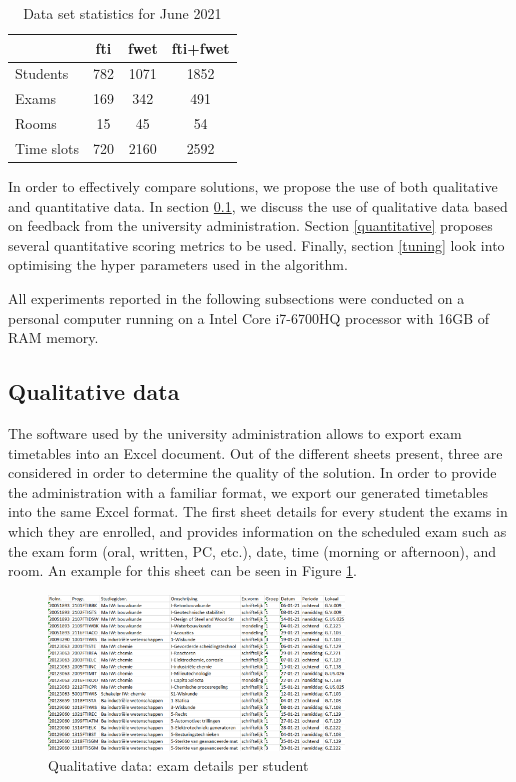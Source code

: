 \begin{table}[h]
	\caption{Data set statistics for June 2021}
	\label{tab:data_set_sem2}
	\centering
	\begin{tabular}{l c c c }
		\hline
		& \textbf{\acrshort{fti}} & \textbf{\acrshort{fwet}} & \textbf{\acrshort{fti}+\acrshort{fwet}} \\ \hline
		Students & 782 & 1071 & 1852 \\
		Exams & 169 & 342 & 491 \\
	    Rooms & 15 & 45 & 54 \\
        Time slots & 720 & 2160 & 2592 \\ \hline
	\end{tabular}
\end{table}

In order to effectively compare solutions, we propose the use of both qualitative and quantitative data. In section \ref{qualitative}, we discuss the use of qualitative data based on feedback from the university administration. Section \ref{quantitative} proposes several quantitative scoring metrics to be used. Finally, section \ref{tuning} look into optimising the hyper parameters used in the algorithm.

All experiments reported in the following subsections were conducted on a personal computer running on a Intel Core i7-6700HQ processor with 16GB of RAM memory.

\subsection{Qualitative data} \label{qualitative}

The software used by the university administration allows to export exam timetables into an Excel document. Out of the different sheets present, three are considered in order to determine the quality of the solution. In order to provide the administration with a familiar format, we export our generated timetables into the same Excel format. The first sheet details for every student the exams in which they are enrolled, and provides information on the scheduled exam such as the exam form (oral, written, PC, etc.), date, time (morning or afternoon), and room. An example for this sheet can be seen in Figure \ref{fig:sheet1}. 

\begin{figure}[H]
	\centering
	\includegraphics[width=0.7\textwidth]{images/excel/excel_sheet1.png} 
	\caption{Qualitative data: exam details per student}
	\label{fig:sheet1}
\end{figure}

